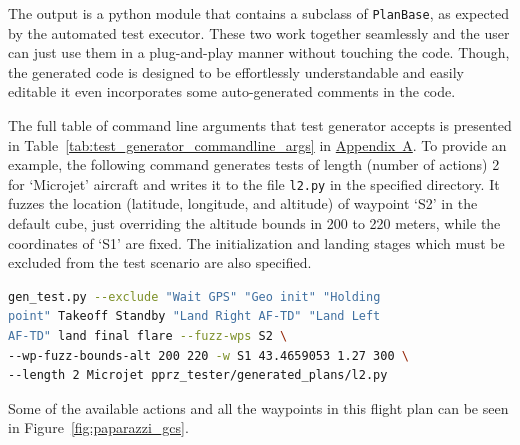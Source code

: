 The output is a python module that contains a subclass of \verb|PlanBase|, as expected by the automated test executor. These two work together seamlessly and the user can just use them in a plug-and-play manner without touching the code. Though, the generated code is designed to be effortlessly understandable and easily editable it even incorporates some auto-generated comments in the code.

The full table of command line arguments that test generator accepts is presented in Table~\ref{tab:test_generator_commandline_args} in \hyperref[appendixa]{Appendix~A}. To provide an example, the following command generates tests of length (number of actions) 2 for `Microjet' aircraft and writes it to the file \verb|l2.py| in the specified directory. It fuzzes the location (latitude, longitude, and altitude) of waypoint `S2' in the default cube, just overriding the altitude bounds in 200 to 220 meters, while the coordinates of `S1' are fixed. The initialization and landing stages which must be excluded from the test scenario are also specified. 
\begin{lstlisting}[language=bash]
gen_test.py --exclude "Wait GPS" "Geo init" "Holding 
point" Takeoff Standby "Land Right AF-TD" "Land Left 
AF-TD" land final flare --fuzz-wps S2 \
--wp-fuzz-bounds-alt 200 220 -w S1 43.4659053 1.27 300 \
--length 2 Microjet pprz_tester/generated_plans/l2.py
\end{lstlisting}
Some of the available actions and all the waypoints in this flight plan can be seen in Figure~\ref{fig:paparazzi_gcs}.












